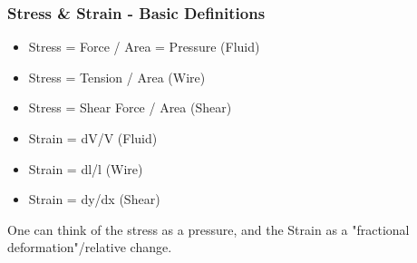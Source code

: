 \subsubsection{Stress \& Strain - Basic Definitions}
\begin{itemize}
    \item Stress = Force / Area = Pressure (Fluid)
    \item Stress = Tension / Area (Wire)
    \item Stress = Shear Force / Area (Shear)
    \item Strain = dV/V (Fluid)
    \item Strain = dl/l (Wire)
    \item Strain = dy/dx (Shear)
\end{itemize}
One can think of the stress as a pressure, and the Strain as a "fractional deformation"/relative change.

